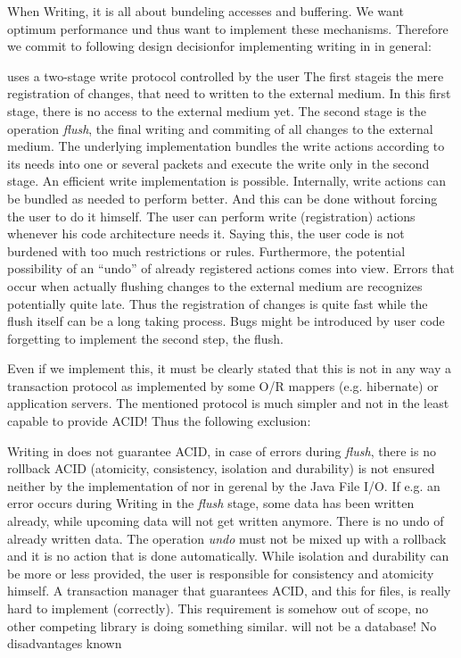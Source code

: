 When Writing, it is all about bundeling accesses and buffering. We want optimum performance und thus want to implement these mechanisms. Therefore we commit to following design decisionfor implementing writing in \LibName{} in general:

{%
\COMPmedia{} uses a two-stage write protocol controlled by the user
}
{%
The first stageis the mere registration of changes, that need to written to the external medium. In this first stage, there is no access to the external medium yet. The second stage is the operation \emph{flush}, the final writing and commiting of all changes to the external medium. The underlying implementation bundles the write actions according to its needs into one or several packets and execute the write only in the second stage.
}
{%
An efficient write implementation is possible. Internally, write actions can be bundled as needed to perform better. And this can be done without forcing the user to do it himself. The user can perform write (registration) actions whenever his code architecture needs it. Saying this, the user code is not burdened with too much restrictions or rules. Furthermore, the potential possibility of an ``undo'' of already registered actions comes into view.
}
{%
Errors that occur when actually flushing changes to the external medium are recognizes potentially quite late. Thus the registration of changes is quite fast while the flush itself can be a long taking process. Bugs might be introduced by user code forgetting to implement the second step, the flush.
}

Even if we implement this, it must be clearly stated that this is not in any way a transaction protocol as implemented by some O/R mappers (e.g. hibernate) or application servers. The mentioned protocol is much simpler and not in the least capable to provide ACID! Thus the following exclusion:

{%
Writing in \COMPmedia{} does not guarantee ACID, in case of errors during \emph{flush}, there is no rollback
}
{%
ACID (atomicity, consistency, isolation and durability) is not ensured neither by the implementation of \COMPmedia{} nor in gerenal by the Java File I/O. If e.g. an error occurs during Writing in the \emph{flush} stage, some data has been written already, while upcoming data will not get written anymore. There is no undo of already written data. The operation \emph{undo} must not be mixed up with a rollback and it is no action that is done automatically. While isolation and durability can be more or less provided, the user is responsible for consistency and atomicity himself.
}
{%
A transaction manager that guarantees ACID, and this for files, is really hard to implement (correctly). This requirement is somehow out of scope, no other competing library is doing something similar. \LibName{} will not be a database!
}
{%
No disadvantages known
}


